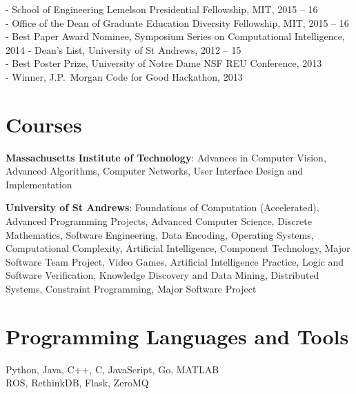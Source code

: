 \documentclass[line,margin]{cv}
\begin{document}
\begin{resume}
- School of Engineering Lemelson Presidential Fellowship, MIT, 2015 -- 16\\
- Office of the Dean of Graduate Education Diversity Fellowship, MIT, 2015 -- 16\\
- Best Paper Award Nominee, Symposium Series on Computational Intelligence, 2014
- Dean's List, University of St Andrews, 2012 -- 15\\
- Best Poster Prize, University of Notre Dame NSF REU Conference, 2013\\
- Winner, J.P.\ Morgan Code for Good Hackathon, 2013


\section{Courses}

\textbf{Massachusetts Institute of Technology}:
Advances in Computer Vision, Advanced Algorithms, Computer Networks,
User Interface Design and Implementation

\textbf{University of St Andrews}:
Foundations of Computation (Accelerated), Advanced Programming Projects,
Advanced Computer Science, Discrete Mathematics, Software Engineering,
Data Encoding, Operating Systems, Computational Complexity,
Artificial Intelligence, Component Technology, Major Software Team Project,
Video Games, Artificial Intelligence Practice, Logic and Software Verification,
Knowledge Discovery and Data Mining, Distributed Systems, Constraint Programming,
Major Software Project

\section{Programming Languages and Tools}

Python, Java, C++, C, JavaScript, Go, MATLAB \\
ROS, RethinkDB, Flask, ZeroMQ

\end{resume}
\end{document}
